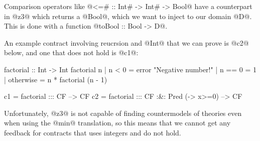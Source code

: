 Comparison operators like @<=# :: Int# -> Int# -> Bool@ have a counterpart
in @z3@ which returns a @Bool@, which we want to inject to our domain @D@.
This is done with a function @toBool :: Bool -> D@.

An example contract involving reucrsion and @Int@ that we can prove is
@c2@ below, and one that does not hold is @c1@:

\begin{code}
factorial :: Int -> Int
factorial n
    | n < 0     = error "Negative number!"
    | n == 0    = 1
    | otherwise = n * factorial (n - 1)

c1 = factorial ::: CF --> CF
c2 = factorial ::: CF :&: Pred (\x -> x>=0) --> CF
\end{code}

Unfortunately, @z3@ is not capable of finding countermodels of
theories even when using the @min@ translation, so this means that we
cannot get any feedback for contracts that uses integers and do not
hold.
